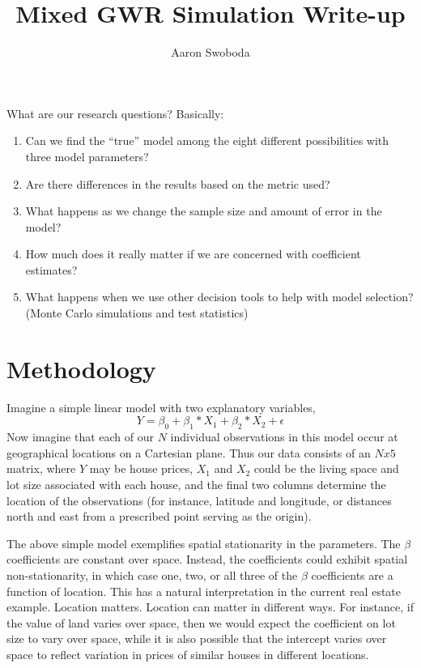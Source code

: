 \documentclass{article}\usepackage{graphicx, color}
\title{Mixed GWR Simulation Write-up}
\author{Aaron Swoboda}
\begin{document}
\maketitle

What are our research questions? Basically:
\begin{enumerate}
\item Can we find the ``true'' model among the eight different possibilities with three model parameters?
\item Are there differences in the results based on the metric used?
\item What happens as we change the sample size and amount of error in the model?
\item How much does it really matter if we are concerned with coefficient estimates?
\item What happens when we use other decision tools to help with model selection? (Monte Carlo simulations and test statistics)
\end{enumerate}





\section{Methodology}

Imagine a simple linear model with two explanatory variables,
\begin{equation}
Y = \beta _0 + \beta _1 *X_1 + \beta _2 * X_2 + \epsilon
\end{equation}
Now imagine that each of our $N$ individual observations in this model occur at geographical locations on a Cartesian plane. Thus our data consists of an $N x 5$ matrix, where $Y$ may be house prices, $X_1$ and $X_2$ could be the living space and lot size associated with each house, and the final two columns determine the location of the observations (for instance, latitude and longitude, or distances north and east from a prescribed point serving as the origin).

The above simple model exemplifies spatial stationarity in the parameters. The $\beta$ coefficients are constant over space. Instead, the coefficients could exhibit spatial non-stationarity, in which case one, two, or all three of the $\beta$ coefficients are a function of location. This has a natural interpretation in the current real estate example. Location matters. Location can matter in different ways. For instance, if the value of land varies over space, then we would expect the coefficient on lot size to vary over space, while it is also possible that the intercept varies over space to reflect variation in prices of similar houses in different locations. 
\end{document}
